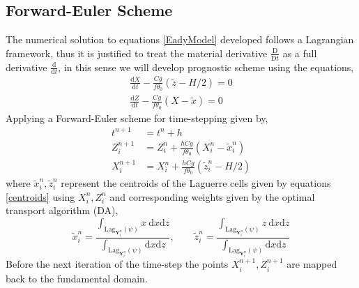 \subsection{Forward-Euler Scheme}
The numerical solution to equations \ref{EadyModel} developed follows a Lagrangian framework, thus it is justified to treat the material derivative $\frac{\mathrm{D } }{\mathrm{D} t}$ as a full derivative $\frac{\mathrm{d }}{\mathrm{d} t}$, in this sense we will develop prognostic scheme using the equations,
	\begin{equation*}
	\begin{aligned}
	\frac{\mathrm{d}X}{\mathrm{d}t} -\frac{Cg}{f\theta _0}\left(\tilde{z}-H/2\right) = 0 \\
	\frac{\mathrm{d}Z}{\mathrm{d}t} - \frac{Cg}{f\theta_0}\left(X - \tilde{x}\right) = 0
	\end{aligned}
	\end{equation*}
Applying a Forward-Euler scheme \cite{Griffiths2010} for time-stepping given by,
\begin{equation}
	\begin{aligned}
	t^{n+1} &= t^n + h\\
	Z_i^{n+1} &= Z_i^n + \frac{hCg}{f\theta_0}\left(X_i^n-\tilde{x}_i^n\right)\\
	X_i^{n+1} &= X_i^n + \frac{hCg}{f\theta_0}\left(\tilde{z}_i^n-H/2\right)
	\end{aligned}
\end{equation}
where $\tilde{x}_i^n,\tilde{z}_i^n$ represent the centroids of the Laguerre cells given by equations \ref{centroids} using $X_i^n,Z_i^n$ and corresponding weights given by the optimal transport algorithm (DA),
\begin{equation}
	\tilde{x}_i^n = \frac{\int_{\mathrm{Lag}_{\bm{Y}_i^n}(\psi)} x \  \mathrm{d}x \mathrm{d}z}{\int_{\mathrm{Lag}_{\bm{Y}_i^n}(\psi)} \mathrm{d}x \mathrm{d}z}, \qquad
	\tilde{z}_i^n = \frac{\int_{\mathrm{Lag}_{\bm{Y}_i^n}(\psi)} z \ \mathrm{d}x \mathrm{d}z}{\int_{\mathrm{Lag}_{\bm{Y}_i^n}(\psi)} \mathrm{d}x \mathrm{d}z}
	\label{centroids}
\end{equation}
Before the next iteration of the time-step the points $X_i^{n+1}, Z_i^{n+1}$ are mapped back to the fundamental domain.
